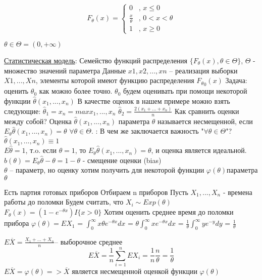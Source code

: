 \documentclass{article}
\begin{document}
\begin{equation*}
F_{\theta}(x) = 
 \begin{cases}
   0 &\text{, $x \leqslant 0$}\\
   \frac{x}{\theta}&\text{, $0<x<\theta$}\\
   1 &\text{, $x \geqslant 0 $}
 \end{cases}
\end{equation*}

$\theta \in \Theta = (0, +\infty)$

\underline{Статистическая модель}:
Семейство функций распределения 
$\{F_{\theta}(x), \theta \in \Theta\}$, $\Theta$ - множество значений параметра
Данные $x1, x2, ..., xn$ -- реализация выборки $X1, ..., Xn$, элементы которой имеют функцию распределения ${F_{\theta}}_0(x)$
Задача: оценить ${\theta}_0$ как можно более точно.
${\theta}_0$ будем оценивать при помощи некоторой функции $\hat{\theta}(x_1, ..., x_n)$
В качестве оценок в нашем примере можно взять следующие:
$\hat{\theta}_1 = x_n = max{x_1, ..., x_n}$
$\hat{\theta}_2 = \frac{2(x_1+ ... +x_n)}{n}$
Как сравнить оценки между собой?
\Def Оценка $\hat{\theta}(x_1, ..., x_n)$ параметра $\theta$ называется несмещенной, если $E_{\theta}\hat{\theta}(x_1, ..., x_n) = \theta$ $\forall \theta \in \Theta$.
\Zam:
В чем же заключается важность "$\forall \theta \in \Theta$"?
 $\hat{\theta}(x_1, ..., x_n) \equiv 1$ \\
 $E\hat{\theta} = 1 $, т.o. если  $\theta = 1$, то $E_{\theta}\hat{\theta}(x_1, ..., x_n) = \theta$, и оценка является идеальной. \\
$b(\theta) = E_{\theta}\hat{\theta} - \theta = 1 - \theta$ - смещение оценки (bias) \\
$\theta$ -- параметр, но оценку хотим получить для некоторой функции $\varphi(\theta)$параметра $\theta$

\Ex Есть партия готовых приборов 
Отбираем n приборов 
Пусть $X_1, ..., X_n$ - времена работы до поломки
Будем считать, что $X_i \sim Exp(\theta)$
$F_{\theta}(x) = (1-e^{-\theta x})I\{x>0\}$
Хотим оценить среднее время до поломки прибора
$\varphi (\theta) = EX_1$ = $\int_{0}^{\infty} x\theta e^{-\theta x}dx$ = $\theta\int_{0}^{\infty} x e^{-\theta x}dx$ = $\frac{1}{\theta}\int_0^{\infty} ye^{-y}dy$ = $\frac{1}{\theta}$

$E \overline{X} = \frac{X_1 + ... + X_n}{n}$-- выборочное среднее
$$ E\overline{X} = \frac{1}{n} \sum\limits_{i=1}^n EX_i = \frac{1}{n} \frac{n}{\theta} = \frac{1}{\theta} $$
$E \overline{X} = \varphi(\theta) => \overline{X}$ является несмещенной оценкой функции $\varphi(\theta) $
\end{document}
